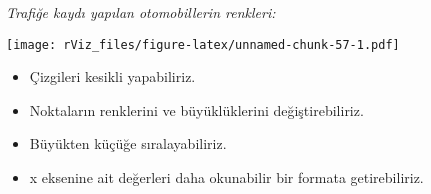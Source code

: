 \documentclass[
]{book}
\newenvironment{Shaded}{\begin{snugshade}}{\end{snugshade}}
\newcommand{\CommentTok}[1]{\textcolor[rgb]{0.56,0.35,0.01}{\textit{#1}}}
\newcommand{\DataTypeTok}[1]{\textcolor[rgb]{0.13,0.29,0.53}{#1}}
\newcommand{\DecValTok}[1]{\textcolor[rgb]{0.00,0.00,0.81}{#1}}
\newcommand{\KeywordTok}[1]{\textcolor[rgb]{0.13,0.29,0.53}{\textbf{#1}}}
\newcommand{\NormalTok}[1]{#1}
\newcommand{\OperatorTok}[1]{\textcolor[rgb]{0.81,0.36,0.00}{\textbf{#1}}}
\newcommand{\StringTok}[1]{\textcolor[rgb]{0.31,0.60,0.02}{#1}}
\begin{document}
\emph{Trafiğe kaydı yapılan otomobillerin renkleri:}

\begin{Shaded}
\end{Shaded}

\texttt{[image: rViz\_files/figure-latex/unnamed-chunk-57-1.pdf]}

\begin{itemize}
\item
  Çizgileri kesikli yapabiliriz.
\item
  Noktaların renklerini ve büyüklüklerini değiştirebiliriz.
\item
  Büyükten küçüğe sıralayabiliriz.
\item
  x eksenine ait değerleri daha okunabilir bir formata getirebiliriz.
\end{itemize}
\end{document}
